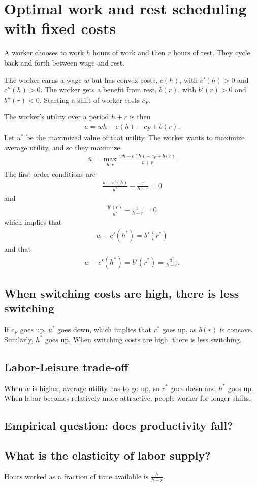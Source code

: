 \section{Optimal work and rest scheduling with fixed costs}

A worker chooses to work $h$ hours of work and then $r$ hours of rest.
They cycle back and forth between wage and rest.

The worker earns a wage $w$ but has convex costs, $c(h)$, with $c'(h) > 0$ and $c''(h) > 0$. 
The worker gets a benefit from rest, $b(r)$, with $b'(r) > 0$ and $b''(r) < 0$.
Starting a shift of worker costs $c_F$.

The worker's utility over a period $h + r$ is then
\begin{align}
  u = wh - c(h) - c_F + b(r). 
\end{align}
Let $u^*$ be the maximized value of that utility. 
The worker wants to maximize average utility, and so they maximize
\begin{align}
  \bar{u} = \max_{h,r} \frac{wh - c(h) - c_F + b(r)}{h + r}
\end{align} 
The first order conditions are
\begin{align}
 \frac{w - c'(h)}{u^*} - \frac{1}{h + r} = 0  
\end{align} 
and
\begin{align}
 \frac{b'(r)}{u^*} - \frac{1}{h + r} = 0  
\end{align} 
which implies that
\begin{align}
  w - c'(h^*) = b'(r^*)
\end{align} 
and that
\begin{align}
  w - c'(h^*) = b'(r^*) = \frac{u^*}{h + r}.
\end{align}

\subsection{When switching costs are high, there is less switching}
If $c_F$ goes up, $\bar{u}^*$ goes down, which implies that $r^*$ goes up, as $b(r)$ is concave.
Similarly, $h^*$ goes up.
When switching costs are high, there is less switching.

\subsection{Labor-Leisure trade-off}
When $w$ is higher, average utility has to go up, so $r^*$ goes down and $h^*$ goes up.
When labor becomes relatively more attractive, people worker for longer shifts. 

\subsection{Empirical question: does productivity fall?}

\subsection{What is the elasticity of labor supply?}

Hours worked as a fraction of time available is $\frac{h}{h + r}$.






